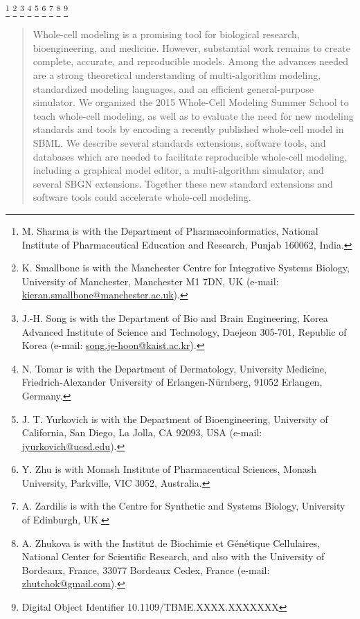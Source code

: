 \documentclass[journal,transmag]{IEEEtran}
\newcommand{\email}[1]{\href{mailto:#1}{#1}}
\begin{document}
{    \thanks{M. Sharma is with the Department of Pharmacoinformatics, National Institute of Pharmaceutical Education and Research, Punjab 160062, India.}
    \thanks{K. Smallbone is with the Manchester Centre for Integrative Systems Biology, University of Manchester, Manchester M1 7DN, UK (e-mail: \email{kieran.smallbone@manchester.ac.uk}).}
    \thanks{J.-H. Song is with the Department of Bio and Brain Engineering, Korea Advanced Institute of Science and Technology, Daejeon 305-701, Republic of Korea (e-mail: \email{song.je-hoon@kaist.ac.kr}).}
    \thanks{N. Tomar is with the Department of Dermatology, University Medicine, Friedrich-Alexander University of Erlangen-N\"urnberg, 91052 Erlangen, Germany.}
    \thanks{J. T. Yurkovich is with the Department of Bioengineering, University of California, San Diego, La Jolla, CA 92093, USA (e-mail: \email{jyurkovich@ucsd.edu}).}
    \thanks{Y. Zhu is with Monash Institute of Pharmaceutical Sciences, Monash University, Parkville, VIC 3052, Australia.}
    \thanks{A. Zardilis is with the Centre for Synthetic and Systems Biology, University of Edinburgh, UK.} 
    \thanks{A. Zhukova is with the Institut de Biochimie et G\'en\'etique Cellulaires, National Center for Scientific Research, and also with the University of Bordeaux, France, 33077 Bordeaux Cedex, France (e-mail: \email{zhutchok@gmail.com}).}
    \thanks{Digital Object Identifier 10.1109/TBME.XXXX.XXXXXXX}
}

\maketitle

\begin{abstract}
Whole-cell modeling is a promising tool for biological research, bioengineering, and medicine. 
However, substantial work remains to create complete, accurate, and reproducible models.
Among the advances needed are a strong theoretical understanding of multi-algorithm modeling, standardized modeling languages, and an efficient general-purpose simulator.
We organized the 2015 Whole-Cell Modeling Summer School to teach whole-cell modeling, as well as to evaluate the need for new modeling standards and tools by encoding a recently published whole-cell model in SBML.
We describe several standards extensions, software tools, and databases which are needed to facilitate reproducible whole-cell modeling, including a graphical model editor, a multi-algorithm simulator, and several SBGN extensions.
Together these new standard extensions and software tools could accelerate whole-cell modeling.
\end{abstract}
\end{document}
